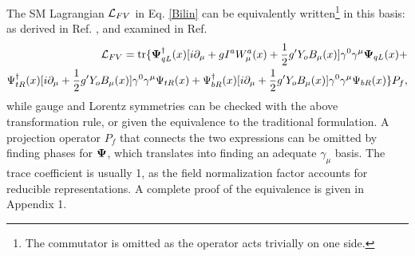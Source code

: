 \documentclass[12pt]{article}
\renewcommand\[{\begin{dmath}}
\renewcommand\]{\end{dmath}}
\newcommand{\boldmathPsi}{\mbox{\boldmath$\Psi$\unboldmath}}
\begin{document}
The  SM     Lagrangian ${\cal L}_{FV}$ in Eq. \ref{Bilin} can be equivalently written\footnote{The commutator is omitted as the operator acts trivially on one side.}  in this basis:
as derived in Ref. \cite{BesproRicardo}, and examined in Ref. \cite{BesproRicardoNuc}
\begin{eqnarray}
\label {BilinNoTracElectroweak}
   {\cal L}_{FV}=
  {\rm tr } \{ { \boldmathPsi_{qL}   ^\dagger     }(x)       [ i\partial_\mu +  g I^a  W_\mu^a(x)  + \frac{1}{2} g'   Y_o  B_\mu (x) ]  \gamma^0  \gamma^\mu   \boldmathPsi_{qL} (x) + \nonumber \\
         \Psi _{tR } ^\dagger (x)       [ i\partial_\mu   +  \frac{1}{2}  g' Y_o B_\mu (x) ]    \gamma^0 \gamma^\mu     {     \Psi _{tR }}(x)
 +{     \Psi}_{bR}  ^\dagger(x)             [ i\partial_\mu   +\frac{1}{2} g'  Y_o  B_\mu (x) ]   \gamma^0 \gamma^\mu    { \Psi_{bR} }(x)  \}P_f ,
\end{eqnarray}
while gauge and Lorentz symmetries can be checked with the above transformation rule, or given  the equivalence to the traditional formulation. A projection operator $P_f$  that connects the two expressions\cite{BesproRicardoNuc} can be omitted by finding phases for $\boldmathPsi$, which translates into finding an adequate $\gamma_\mu$ basis. The trace coefficient is usually 1, as the field normalization factor accounts for reducible representations. A complete proof of the equivalence is given in Appendix 1.
\end{document}
